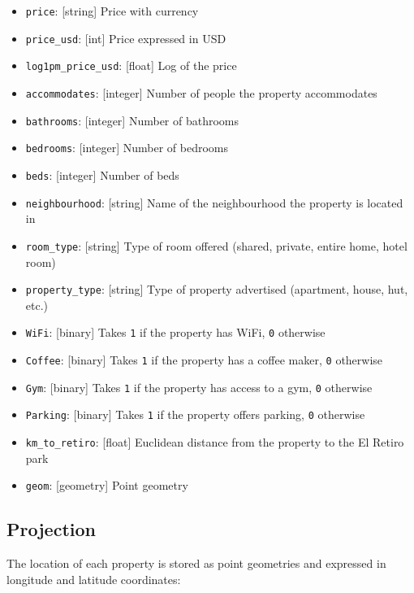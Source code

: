 \documentclass[
  letterpaper,
  DIV=11,
  numbers=noendperiod,
  oneside]{scrreprt}
\providecommand{\tightlist}{%
  \setlength{\itemsep}{0pt}\setlength{\parskip}{0pt}}\usepackage{longtable,booktabs,array}
\begin{document}
\begin{itemize}
\tightlist
\item
  \texttt{price}: {[}string{]} Price with currency
\item
  \texttt{price\_usd}: {[}int{]} Price expressed in USD
\item
  \texttt{log1pm\_price\_usd}: {[}float{]} Log of the price
\item
  \texttt{accommodates}: {[}integer{]} Number of people the property
  accommodates
\item
  \texttt{bathrooms}: {[}integer{]} Number of bathrooms
\item
  \texttt{bedrooms}: {[}integer{]} Number of bedrooms
\item
  \texttt{beds}: {[}integer{]} Number of beds
\item
  \texttt{neighbourhood}: {[}string{]} Name of the neighbourhood the
  property is located in
\item
  \texttt{room\_type}: {[}string{]} Type of room offered (shared,
  private, entire home, hotel room)
\item
  \texttt{property\_type}: {[}string{]} Type of property advertised
  (apartment, house, hut, etc.)
\item
  \texttt{WiFi}: {[}binary{]} Takes \texttt{1} if the property has WiFi,
  \texttt{0} otherwise
\item
  \texttt{Coffee}: {[}binary{]} Takes \texttt{1} if the property has a
  coffee maker, \texttt{0} otherwise
\item
  \texttt{Gym}: {[}binary{]} Takes \texttt{1} if the property has access
  to a gym, \texttt{0} otherwise
\item
  \texttt{Parking}: {[}binary{]} Takes \texttt{1} if the property offers
  parking, \texttt{0} otherwise
\item
  \texttt{km\_to\_retiro}: {[}float{]} Euclidean distance from the
  property to the El Retiro park
\item
  \texttt{geom}: {[}geometry{]} Point geometry
\end{itemize}

\subsection*{Projection}\label{projection}

The location of each property is stored as point geometries and
expressed in longitude and latitude coordinates:
\end{document}
